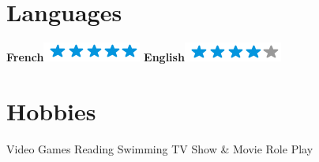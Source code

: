\documentclass[8pt]{friggeri-cv}
\begin{document}
\begin{samepage}
\begin{aside}
  \section{Languages}
    \textbf{French}\includegraphics[scale=0.40]{img/5stars.png}
    \textbf{English}\includegraphics[scale=0.40]{img/4stars.png}
  \section{Hobbies}
    Video Games
    Reading
    Swimming
    TV Show \& Movie
    Role Play
\end{aside}


\end{samepage}
\end{document}
